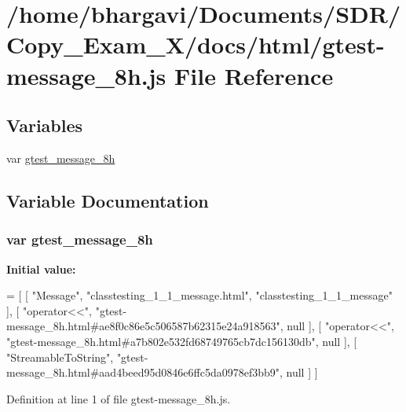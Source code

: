 \hypertarget{gtest-message__8h_8js}{}\section{/home/bhargavi/\+Documents/\+S\+D\+R/\+Copy\+\_\+\+Exam\+\_\+X/docs/html/gtest-\/message\+\_\+8h.js File Reference}
\label{gtest-message__8h_8js}
\subsection*{Variables}
\begin{DoxyCompactItemize}
\item 
var \hyperlink{gtest-message__8h_8js_ac8d0bb2f39eaec7bdcbb939f92b7ad2a}{gtest\+\_\+message\+\_\+8h}
\end{DoxyCompactItemize}


\subsection{Variable Documentation}
\subsubsection[{\texorpdfstring{gtest\+\_\+message\+\_\+8h}{gtest_message_8h}}]{\setlength{\rightskip}{0pt plus 5cm}var gtest\+\_\+message\+\_\+8h}\hypertarget{gtest-message__8h_8js_ac8d0bb2f39eaec7bdcbb939f92b7ad2a}{}\label{gtest-message__8h_8js_ac8d0bb2f39eaec7bdcbb939f92b7ad2a}
{\bfseries Initial value\+:}
\begin{DoxyCode}
=
[
    [ \textcolor{stringliteral}{"Message"}, \textcolor{stringliteral}{"classtesting\_1\_1\_message.html"}, \textcolor{stringliteral}{"classtesting\_1\_1\_message"} ],
    [ \textcolor{stringliteral}{"operator<<"}, \textcolor{stringliteral}{"gtest-message\_8h.html#ae8f0c86e5c506587b62315e24a918563"}, null ],
    [ \textcolor{stringliteral}{"operator<<"}, \textcolor{stringliteral}{"gtest-message\_8h.html#a7b802e532fd68749765cb7dc156130db"}, null ],
    [ \textcolor{stringliteral}{"StreamableToString"}, \textcolor{stringliteral}{"gtest-message\_8h.html#aad4beed95d0846e6ffc5da0978ef3bb9"}, null ]
]
\end{DoxyCode}


Definition at line 1 of file gtest-\/message\+\_\+8h.\+js.

